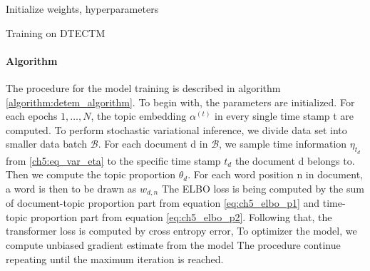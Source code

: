 \begin{algorithm}[H]
Initialize weights, hyperparameters\\
\caption{Training on DTECTM}
\label{algorithm:detem_algorithm}
\end{algorithm}
\paragraph{Algorithm}The procedure for the model training is described in algorithm \ref{algorithm:detem_algorithm}. To begin with, the parameters are initialized.
For each epochs $ 1,\dots, N $, the topic embedding $ \alpha^{(t)} $ in every single time stamp t are computed. 
To perform stochastic variational inference, we divide data set into smaller data batch $ \mathcal{B} $.
For each document d in $ \mathcal{B} $, we sample time information $ \eta_{t_d} $ from \ref{ch5:eq_var_eta} to the specific time stamp $ t_d $ the document d belongs to.
Then we compute the topic proportion $ \theta_d $. For each word position n in document, a word is then to be drawn as $ w_{d,n} $
The ELBO loss is being computed by the sum of document-topic proportion part from equation \ref{eq:ch5_elbo_p1} and time-topic proportion part from equation \ref{eq:ch5_elbo_p2}.
Following that, the transformer loss is computed by cross entropy error, 
To optimizer the model, we compute unbiased gradient estimate from the model 
The procedure continue repeating until the maximum iteration is reached.

